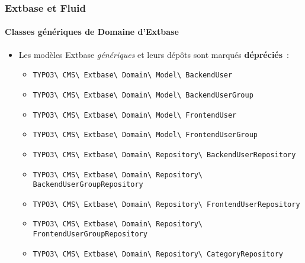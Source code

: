 %

\begin{frame}[fragile]
	\frametitle{Extbase et Fluid}
	\framesubtitle{Classes génériques de Domaine d'Extbase}


	\begin{itemize}
		\item Les modèles Extbase \textit{génériques} et leurs dépôts sont
			marqués \textbf{dépréciés}~:
			\vspace{0.1cm}
			\begin{itemize}\smaller
				\item \texttt{TYPO3\textbackslash
					CMS\textbackslash
					Extbase\textbackslash
					Domain\textbackslash
					Model\textbackslash
					BackendUser}
				\item \texttt{TYPO3\textbackslash
					CMS\textbackslash
					Extbase\textbackslash
					Domain\textbackslash
					Model\textbackslash
					BackendUserGroup}
				\item \texttt{TYPO3\textbackslash
					CMS\textbackslash
					Extbase\textbackslash
					Domain\textbackslash
					Model\textbackslash
					FrontendUser}
				\item \texttt{TYPO3\textbackslash
					CMS\textbackslash
					Extbase\textbackslash
					Domain\textbackslash
					Model\textbackslash
					FrontendUserGroup}
			\end{itemize}\normalsize
			\vspace{0.1cm}
			\begin{itemize}\smaller
				\item \texttt{TYPO3\textbackslash
					CMS\textbackslash
					Extbase\textbackslash
					Domain\textbackslash
					Repository\textbackslash
					BackendUserRepository}
				\item \texttt{TYPO3\textbackslash
					CMS\textbackslash
					Extbase\textbackslash
					Domain\textbackslash
					Repository\textbackslash
					BackendUserGroupRepository}
				\item \texttt{TYPO3\textbackslash
					CMS\textbackslash
					Extbase\textbackslash
					Domain\textbackslash
					Repository\textbackslash
					FrontendUserRepository}
				\item \texttt{TYPO3\textbackslash
					CMS\textbackslash
					Extbase\textbackslash
					Domain\textbackslash
					Repository\textbackslash
					FrontendUserGroupRepository}
				\item \texttt{TYPO3\textbackslash
					CMS\textbackslash
					Extbase\textbackslash
					Domain\textbackslash
					Repository\textbackslash
					CategoryRepository}
			\end{itemize}\normalsize


\end{itemize}
\end{frame}
